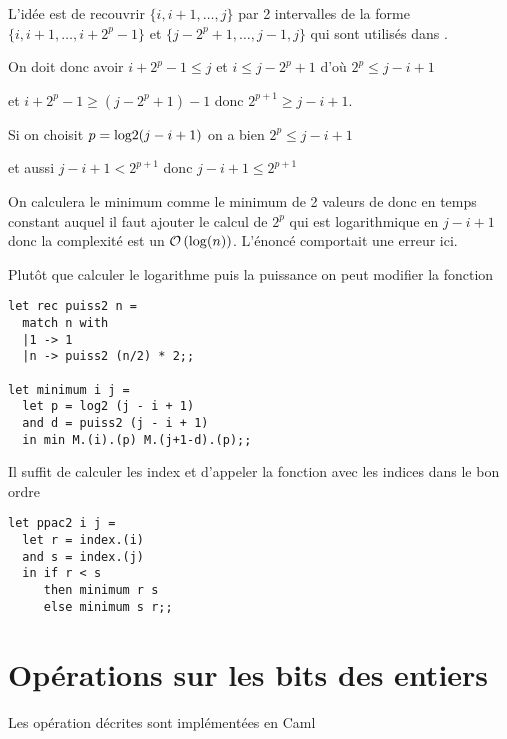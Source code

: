 \begin{Exercise}
L'idée est de recouvrir $\{i,i+1,\ldots,j\}$ par 2 intervalles de la forme $\{i,i+1,\ldots,i+2^{p}-1\}$ et $\{j-2^p+1,\ldots,j-1,j\}$ qui sont utilisés dans .

On doit donc avoir $i+2^{p}-1\le j$ et $i \le j-2^p+1$ d'où $2^p \le j -i +1$ 

et $i+2^{p}-1\ge (j-2^p+1)-1$ donc $2^{p+1} \ge j-i+1$.

Si on choisit $p = \hbox{log2}(j-i+1)$ on a bien $2^p \le j -i +1$ 

et aussi $j-i+1< 2^{p+1}$ donc $j-i+1 \le 2^{p+1}$

On calculera le minimum comme le minimum de 2 valeurs de  donc en temps constant auquel il faut ajouter le calcul de  $2^p$ qui est logarithmique en $j-i+1$ donc la complexité est un ${\cal O}\left(\log(n)\right)$. L'énoncé comportait une erreur ici.

Plutôt que calculer le logarithme puis la puissance on peut modifier la fonction 

\begin{lstlisting}
let rec puiss2 n = 
  match n with
  |1 -> 1
  |n -> puiss2 (n/2) * 2;;

let minimum i j =
  let p = log2 (j - i + 1) 
  and d = puiss2 (j - i + 1)
  in min M.(i).(p) M.(j+1-d).(p);;
\end{lstlisting}
\end{Exercise}
\begin{Exercise}
Il suffit de calculer les index et d'appeler la fonction  avec les indices dans le bon ordre
\begin{lstlisting}
let ppac2 i j =
  let r = index.(i)
  and s = index.(j)
  in if r < s
     then minimum r s
     else minimum s r;;
\end{lstlisting}
\end{Exercise}
\newpage
\section{Opérations sur les bits des entiers}
Les opération décrites sont implémentées en Caml

